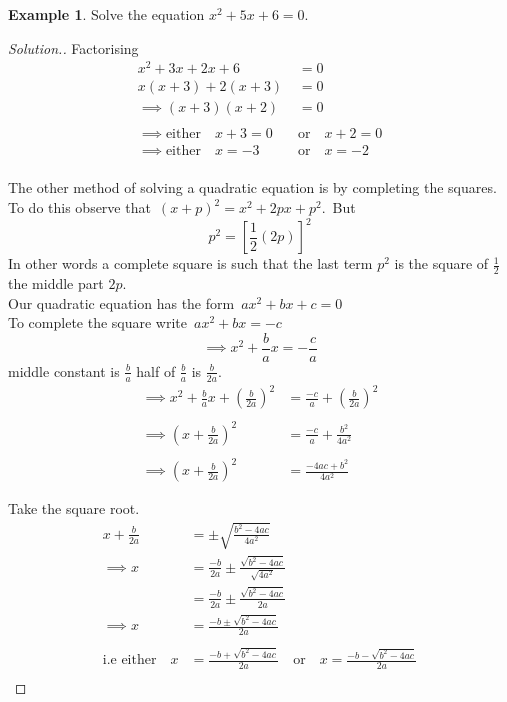 \documentclass[11pt,a4paper]{article}
\theoremstyle{definition}
\newtheorem{example}[thm]{Example}
\newenvironment{solution}
  {\renewcommand{\qedsymbol}{}\begin{proof}[\textit{Solution}.]}
  {\end{proof}}
\begin{document}
\begin{example}
 Solve the equation $x^2+5x+6=0$.
\end{example}
\begin{solution}
 Factorising
\begin{align*}
x^2+3x+2x+6 & = 0\\
x(x+3)+2(x+3) & =0\\
\implies (x+3)(x+2) & = 0\\\\
\implies \text{either}\quad  x+3=0\quad  &\text{or}\quad  x+2=0\\
\implies \text{either}\quad  x=-3\quad  & \text{or}\quad  x=-2\\
\end{align*}



The other method of solving a quadratic equation is by completing the squares. To do this observe that \,$(x+p)^2=x^2+2px+p^2$.\, But $$p^2=\left[\frac{1}{2}(2p)\right]^2$$
In other words a complete square is such that the last term $p^2$ is the square of $\frac{1}{2}$ the middle part $2p$.\\

Our quadratic equation has the form \,$ax^2+bx+c=0$\\

To complete the square write \,$ax^2+bx=-c$
$$\implies x^2+\frac{b}{a}x=-\frac{c}{a}$$
middle constant is $\frac{b}{a}$ half of $\frac{b}{a}$ is $\frac{b}{2a}$.
\begin{align*}
\implies x^2+\frac{b}{a}x+\left(\frac{b}{2a}\right)^2 & =\frac{-c}{a}+\left(\frac{b}{2a}\right)^2\\\\
\implies \left(x+\frac{b}{2a}\right)^2 & = \frac{-c}{a}+\frac{b^2}{4a^2}\\\\
\implies \left(x+\frac{b}{2a}\right)^2 & =\frac{-4ac+b^2}{4a^2}
\end{align*}

Take the square root.
\begin{align*}
x+\frac{b}{2a} & = \pm \sqrt{\frac{b^2-4ac}{4a^2}}\\
\implies x & = \frac{-b}{2a}\pm \frac{\sqrt{b^2-4ac}}{\sqrt{4a^2}}\\
           & = \frac{-b}{2a} \pm \frac{\sqrt{b^2-4ac}}{2a}\\
\implies x & = \frac{-b\pm \sqrt{b^2-4ac}}{2a}\\\\
\text{i.e either}\quad  x &=\frac{-b+\sqrt{b^2-4ac}}{2a}\quad   \text{or} \quad  x=\frac{-b-\sqrt{b^2-4ac}}{2a}\\
\end{align*}
\end{solution}
\end{document}
